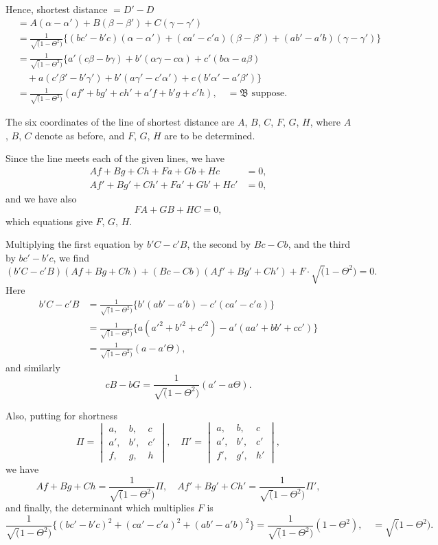 \documentclass[12pt,a4paper]{article}
\theoremstyle{cayley}
\theoremstyle{definition}
\numberwithin{equation}{section}
\begin{document}
Hence, shortest distance $= D' - D$
\begin{align*}
&= A(\alpha - \alpha') + B(\beta - \beta') + C(\gamma - \gamma') \\
&= \frac{1}{\surd(1 - \Theta^2)} \{(bc' - b'c)(\alpha - \alpha') + (ca' - c'a)(\beta - \beta') + (ab' - a'b)(\gamma - \gamma')\} \\
&= \frac{1}{\surd(1 - \Theta^2)} \{a'(c\beta - b\gamma) + b'(\alpha\gamma - c\alpha) + c'(b\alpha - a\beta) \\
&\quad + a(c'\beta' - b'\gamma') + b'(a\gamma' - c'\alpha') + c(b'\alpha' - a'\beta')\} \\
&= \frac{1}{\surd(1 - \Theta^2)} (af' + bg' + ch' + a'f + b'g + c'h), \quad = \mathfrak{B} \text{ suppose}.
\end{align*}

The six coordinates of the line of shortest distance are $A$, $B$, $C$, $F$, $G$, $H$, where $A$, $B$, $C$ denote as before, and $F$, $G$, $H$ are to be determined.

Since the line meets each of the given lines, we have
\begin{align*}
Af + Bg + Ch + Fa + Gb + Hc &= 0, \\
Af' + Bg' + Ch' + Fa' + Gb' + Hc' &= 0,
\end{align*}
and we have also
\[
FA + GB + HC = 0,
\]
which equations give $F$, $G$, $H$.

Multiplying the first equation by $b'C - c'B$, the second by $Bc - Cb$, and the third by $bc' - b'c$, we find
\[
(b'C - c'B)(Af + Bg + Ch) + (Bc - Cb)(Af' + Bg' + Ch') + F \cdot \surd(1 - \Theta^2) = 0.
\]
Here
\begin{align*}
b'C - c'B &= \frac{1}{\surd(1 - \Theta^2)} \{b'(ab' - a'b) - c'(ca' - c'a)\} \\
&= \frac{1}{\surd(1 - \Theta^2)} \{a(a'^2 + b'^2 + c'^2) - a'(aa' + bb' + cc')\} \\
&= \frac{1}{\surd(1 - \Theta^2)} (a - a'\Theta),
\end{align*}
and similarly
\[
cB - bG = \frac{1}{\surd(1 - \Theta^2)} (a' - a\Theta).
\]

Also, putting for shortness
\[
\Pi = \begin{vmatrix} a, & b, & c \\ a', & b', & c' \\ f, & g, & h \end{vmatrix}, \quad \Pi' = \begin{vmatrix} a, & b, & c \\ a', & b', & c' \\ f', & g', & h' \end{vmatrix},
\]
we have
\[
Af + Bg + Ch = \frac{1}{\surd(1 - \Theta^2)} \Pi, \quad Af' + Bg' + Ch' = \frac{1}{\surd(1 - \Theta^2)} \Pi',
\]
and finally, the determinant which multiplies $F$ is
\[
\frac{1}{\surd(1 - \Theta^2)} \{(bc' - b'c)^2 + (ca' - c'a)^2 + (ab' - a'b)^2\} = \frac{1}{\surd(1 - \Theta^2)} (1 - \Theta^2), \quad = \surd(1 - \Theta^2).
\]
\end{document}
